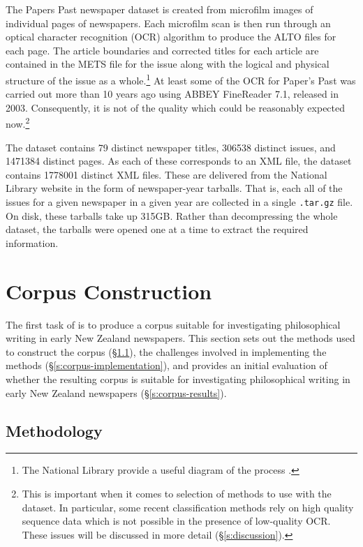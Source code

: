 \documentclass{article}
\newcommand{\ttt}[1]{{\texttt{#1}}}
\begin{document}
The Papers Past newspaper dataset is created from microfilm images of individual pages of newspapers. Each microfilm scan is then run through an optical character recognition (OCR) algorithm to produce the ALTO files for each page. The article boundaries and corrected titles for each article are contained in the METS file for the issue along with the logical and physical structure of the issue as a whole.\footnote{The National Library provide a useful diagram of the process \cite{ppnodp-data-standards}.}
At least some of the OCR for Paper's Past was carried out more than 10 years ago using ABBEY FineReader 7.1, released in 2003. Consequently, it is not of the quality which could be reasonably expected now.\footnote{This is important when it comes to selection of methods to use with the dataset. In particular, some recent classification methods rely on high quality sequence data which is not possible in the presence of low-quality OCR. These issues will be discussed in more detail (\S \ref{s:discussion}).}

The dataset contains 79 distinct newspaper titles, 306538 distinct issues, and
1471384 distinct pages. As each of these corresponds to an XML file, the dataset contains 1778001 distinct XML files. These are delivered from the National Library website in the form of newspaper-year tarballs. That is, each all of the issues for a given newspaper in a given year are collected in a single \ttt{.tar.gz} file. On disk, these tarballs take up 315GB. Rather than decompressing the whole dataset, the tarballs were opened one at a time to extract the required information.

\section{Corpus Construction}\label{s:corpus-construction}

The first task of is to produce a corpus suitable for investigating
philosophical writing in early New Zealand newspapers. This section sets out the methods used to construct the corpus (\S \ref{s:corpus-methods}), the challenges involved in implementing the methods (\S \ref{s:corpus-implementation}), and provides an initial evaluation of whether the resulting corpus is suitable for investigating philosophical writing in early New Zealand newspapers (\S \ref{s:corpus-results}).

\subsection{Methodology}\label{s:corpus-methods}
\end{document}
